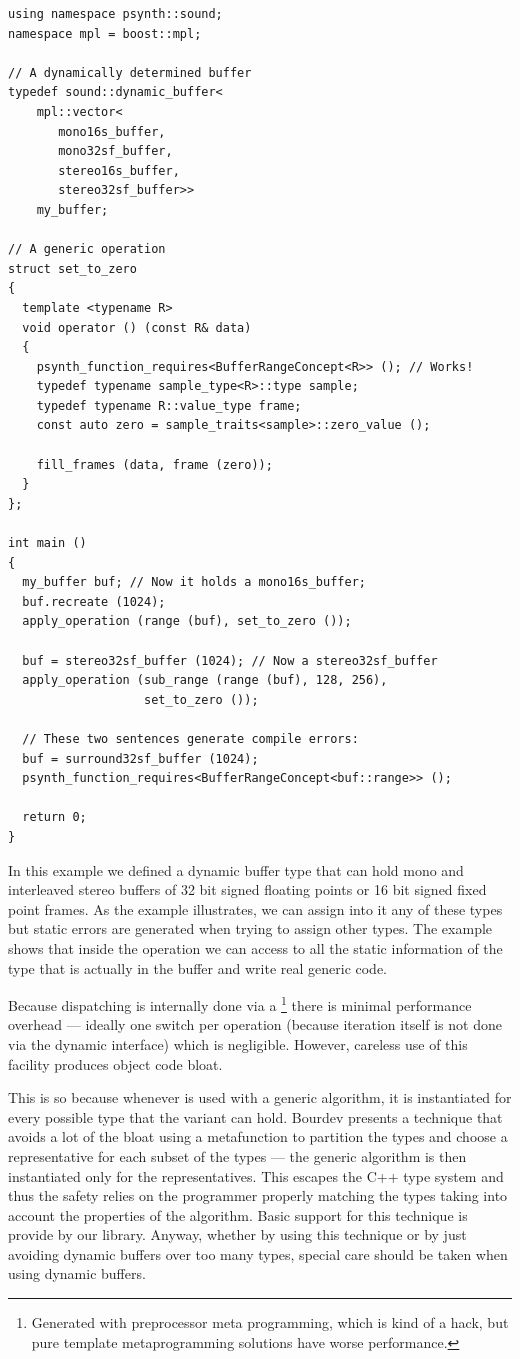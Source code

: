 \begin{lstlisting}
using namespace psynth::sound;
namespace mpl = boost::mpl;

// A dynamically determined buffer
typedef sound::dynamic_buffer<
    mpl::vector<
       mono16s_buffer,
       mono32sf_buffer,
       stereo16s_buffer,
       stereo32sf_buffer>>
    my_buffer;

// A generic operation
struct set_to_zero
{
  template <typename R>
  void operator () (const R& data)
  {
    psynth_function_requires<BufferRangeConcept<R>> (); // Works!
    typedef typename sample_type<R>::type sample;
    typedef typename R::value_type frame;
    const auto zero = sample_traits<sample>::zero_value ();
  
    fill_frames (data, frame (zero));
  }
};

int main ()
{
  my_buffer buf; // Now it holds a mono16s_buffer;
  buf.recreate (1024);
  apply_operation (range (buf), set_to_zero ());
  
  buf = stereo32sf_buffer (1024); // Now a stereo32sf_buffer
  apply_operation (sub_range (range (buf), 128, 256), 
                   set_to_zero ());
  
  // These two sentences generate compile errors:
  buf = surround32sf_buffer (1024);
  psynth_function_requires<BufferRangeConcept<buf::range>> ();
  
  return 0;
}
\end{lstlisting}

In this example we defined a dynamic buffer type that can hold mono
and interleaved stereo buffers of 32 bit signed floating points or 16
bit signed fixed point frames. As the example illustrates, we can
assign into it any of these types but static errors are generated when
trying to assign other types. The example shows that inside the
 operation we can access to all the static
information of the type that is actually in the buffer and write real
generic code.

Because dispatching is internally done via a
\footnote{Generated with preprocessor meta programming,
  which is kind of a hack, but pure template metaprogramming solutions
  have worse performance.} there is minimal performance overhead ---
ideally one switch per operation (because iteration itself is not done
via the dynamic interface) which is negligible. However, careless use
of this facility produces object code bloat. 

This is so because whenever  is used with a
generic algorithm, it is instantiated for every possible type that the
variant can hold. Bourdev presents a technique
\cite{bourdev11efficient} that avoids a lot of the bloat using a
 metafunction to partition the types and choose a
representative for each subset of the types --- the generic algorithm
is then instantiated only for the representatives. This escapes the
C++ type system and thus the safety relies on the programmer properly
matching the types taking into account the properties of the
algorithm. Basic support for this technique is provide by our library.
Anyway, whether by using this technique or by just avoiding dynamic
buffers over too many types, special care should be taken when using
dynamic buffers.

